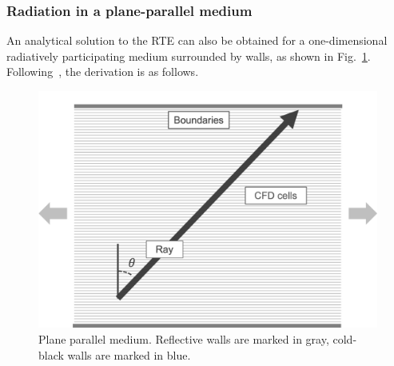 \subsubsection{Radiation in a plane-parallel medium}
An analytical solution to the RTE can also be obtained for a one-dimensional radiatively participating medium surrounded by walls, as shown in Fig.~\ref{fig:PlaneParallel}. Following~\citet{Modest2022ChapterMedia}, the derivation is as follows.
\begin{figure}
\centering
\includegraphics[width=0.5\linewidth]{figures/ch2/PlaneParallelVisualization.png}
\caption{Plane parallel medium. Reflective walls are marked in gray, cold-black walls are marked in blue. }
\label{fig:PlaneParallel}
\end{figure}

